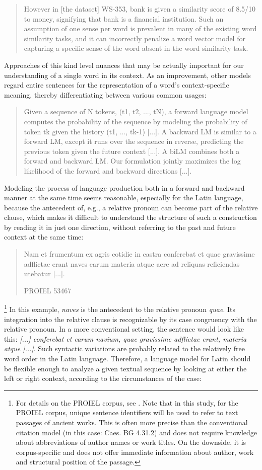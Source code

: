 \documentclass[jou]{apa6} %
\begin{document}
\blockquote[{\cite[p.~4]{faruquiProblemsEvaluationWord2016}}]{However in [the dataset] WS-353, bank is given a similarity score of 8.5/10 to money, signifying that bank is a financial institution. Such an assumption of one sense per word is prevalent in many of the existing word similarity tasks, and it can incorrectly penalize a word vector model for capturing a specific sense of the word absent in the word similarity task.}
Approaches of this kind level nuances that may be actually important for our understanding of a single word in its context. As an improvement, other models regard entire sentences for the representation of a word's context-specific meaning, thereby differentiating between various common usages: 
\blockquote[{\cite[p.~2f.]{petersDeepContextualizedWord2018}}]{Given a sequence of N tokens, (t1, t2, ..., tN), a forward language model computes the probability of the sequence by modeling the probability of token tk given the history (t1, ..., tk-1) [...]. A backward LM is similar to a forward LM, except it runs over the sequence in reverse, predicting the previous token given the future context [...]. A biLM combines both a forward and backward LM. Our formulation jointly maximizes the log likelihood of the forward and backward directions [...].}
Modeling the process of language production both in a forward and backward manner at the same time seems reasonable, especially for the Latin language, because the antecedent of, e.g., a relative pronoun can become part of the relative clause, which makes it difficult to understand the structure of such a construction by reading it in just one direction, without referring to the past and future context at the same time:
\blockquote[{PROIEL 53467}]{Nam et frumentum ex agris cotidie in castra conferebat et quae gravissime adflictae erant naves earum materia atque aere ad reliquas reficiendas utebatur [...].}\footnote{For details on the PROIEL corpus, see \cite{haugCreatingParallelTreebank2008}. Note that in this study, for the PROIEL corpus, unique sentence identifiers will be used to refer to text passages of ancient works. This is often more precise than the conventional citation model (in this case: Caes. BG 4.31.2) and does not require knowledge about abbreviations of author names or work titles. On the downside, it is corpus-specific and does not offer immediate information about author, work and structural position of the passage.}
In this example, \textit{naves} is the antecedent to the relative pronoun \textit{quae}. Its integration into the relative clause is recognizable by its case congruency with the relative pronoun. In a more conventional setting, the sentence would look like this: \textit{[...] conferebat et earum navium, quae gravissime adflictae erant, materia atque [...]}. Such syntactic variations are probably related to the relatively free word order in the Latin language. Therefore, a language model for Latin should be flexible enough to analyze a given textual sequence by looking at either the left or right context, according to the circumstances of the case:
\end{document}
